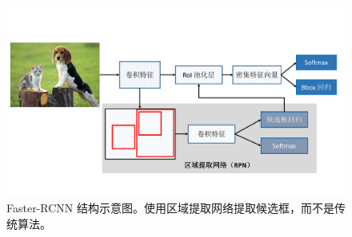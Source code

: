 \begin{figure}[t]
	\centering
	\includegraphics[trim={1.1cm, 2cm, 0.5cm, 3.5cm}, clip,width=\textwidth]{./imgs/Faster-RCNN.pdf}
	\caption{Faster-RCNN 结构示意图。使用区域提取网络提取候选框，而不是传统算法。}
	\label{fig:faster-rcnn}
\end{figure}
